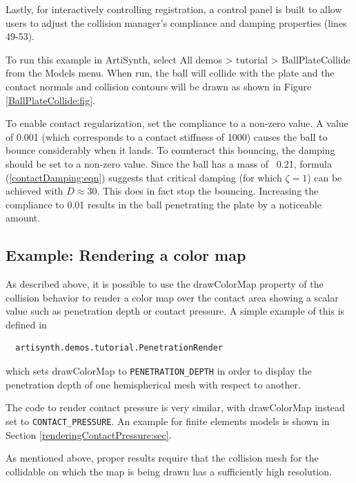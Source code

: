 Lastly, for interactively controlling registration, a control panel is
built to allow users to adjust the collision manager's {\sf
compliance} and {\sf damping} properties (lines 49-53).

To run this example in ArtiSynth, select {\sf All demos > tutorial >
BallPlateCollide} from the {\sf Models} menu. When run, the ball
will collide with the plate and the contact normals and collision 
contours will be drawn as shown in Figure \ref{BallPlateCollide:fig}.

To enable contact regularization, set the {\sf compliance} to a
non-zero value. A value of 0.001 (which corresponds to a contact
stiffness of 1000) causes the ball to bounce considerably when it
lands. To counteract this bouncing, the {\sf damping} should be set to
a non-zero value. Since the ball has a mass of ~0.21, formula
(\ref{contactDamping:eqn}) suggests that critical damping (for which
$\zeta=1$) can be achieved with $D \approx 30$. This does in fact stop
the bouncing. Increasing the compliance to 0.01 results in the ball
penetrating the plate by a noticeable amount.

\subsection{Example: Rendering a color map}
\label{renderingDepth:sec}

As described above, it is possible to use the {\sf drawColorMap}
property of the collision behavior to render a color map over the
contact area showing a scalar value such as penetration depth or
contact pressure. A simple example of this is defined in
%
\begin{verbatim}
  artisynth.demos.tutorial.PenetrationRender
\end{verbatim}
%
which sets {\sf drawColorMap} to {\tt PENETRATION\_DEPTH} in order to
display the penetration depth of one hemispherical mesh with respect
to another. 

\begin{sideblock}
The code to render contact pressure is very similar, with {\sf
drawColorMap} instead set to {\tt CONTACT\_PRESSURE}.  An example for
finite elements models is shown in Section
\ref{renderingContactPressure:sec}.
\end{sideblock}

\begin{sideblock}
As mentioned above, proper results require that the collision mesh for
the collidable on which the map is being drawn has a sufficiently high
resolution.
\end{sideblock}

